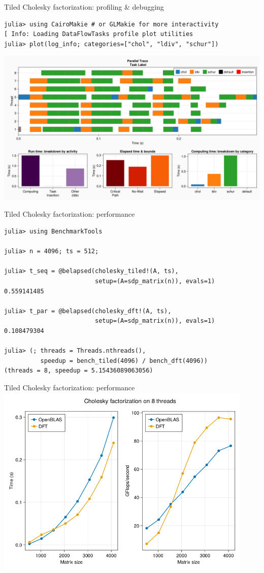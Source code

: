 \documentclass{beamer}
\begin{document}
\begin{frame}[fragile]{Tiled Cholesky factorization: profiling \& debugging}
\begin{verbatim}
julia> using CairoMakie # or GLMakie for more interactivity
[ Info: Loading DataFlowTasks profile plot utilities
julia> plot(log_info; categories=["chol", "ldiv", "schur"])
\end{verbatim}
\includegraphics[width=\textwidth]{Cholesky_profile.png}
\end{frame}

\begin{frame}[fragile]{Tiled Cholesky factorization: performance}
\begin{verbatim}
julia> using BenchmarkTools

julia> n = 4096; ts = 512;

julia> t_seq = @belapsed(cholesky_tiled!(A, ts),
                         setup=(A=sdp_matrix(n)), evals=1)
0.559141485

julia> t_par = @belapsed(cholesky_dft!(A, ts),
                         setup=(A=sdp_matrix(n)), evals=1)
0.108479304

julia> (; threads = Threads.nthreads(),
          speedup = bench_tiled(4096) / bench_dft(4096))
(threads = 8, speedup = 5.15436089063056)
\end{verbatim}
\end{frame}


\begin{frame}{Tiled Cholesky factorization: performance}
\centering\includegraphics[width=0.92\textwidth]{Cholesky_perf.png}
\end{frame}
\end{document}
